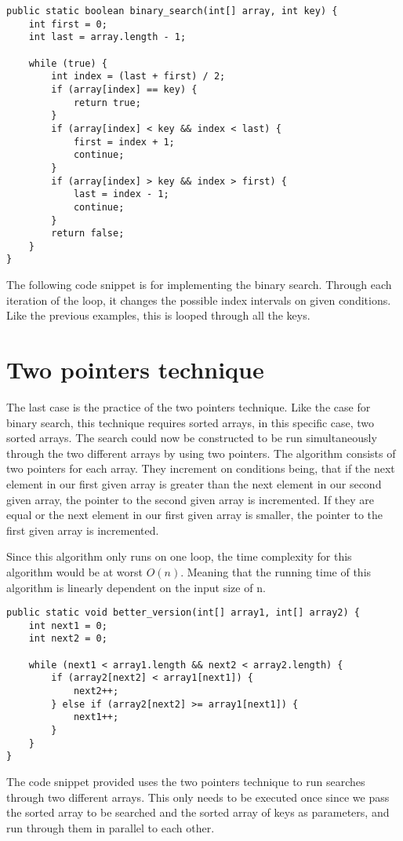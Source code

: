 \documentclass[a4paper,11pt]{article}
\begin{document}
\begin{verbatim}
public static boolean binary_search(int[] array, int key) {
    int first = 0;
    int last = array.length - 1;
    
    while (true) {
        int index = (last + first) / 2;
        if (array[index] == key) {
            return true;
        }
        if (array[index] < key && index < last) {
            first = index + 1;
            continue;
        }
        if (array[index] > key && index > first) {
            last = index - 1;
            continue;
        }
        return false;
    }
}
\end{verbatim}
    The following code snippet is for implementing the binary search. Through each iteration of the loop, it changes the possible index intervals on given conditions. Like the previous examples, this is looped through all the keys.
\section*{Two pointers technique}

    The last case is the practice of the two pointers technique. Like the case for binary search, this technique requires sorted arrays, in this specific case, two sorted arrays. The search could now be constructed to be run simultaneously through the two different arrays by using two pointers. The algorithm consists of two pointers for each array. They increment on conditions being, that if the next element in our first given array is greater than the next element in our second given array, the pointer to the second given array is incremented. If they are equal or the next element in our first given array is smaller, the pointer to the first given array is incremented. 

    Since this algorithm only runs on one loop, the time complexity for this algorithm would be at worst $O(n)$. Meaning that the running time of this algorithm is linearly dependent on the input size of n.
    
\begin{verbatim}
public static void better_version(int[] array1, int[] array2) {
    int next1 = 0;
    int next2 = 0;
    
    while (next1 < array1.length && next2 < array2.length) {
        if (array2[next2] < array1[next1]) {
            next2++;
        } else if (array2[next2] >= array1[next1]) {
            next1++;
        }
    }
}
\end{verbatim}
    The code snippet provided uses the two pointers technique to run searches through two different arrays. This only needs to be executed once since we pass the sorted array to be searched and the sorted array of keys as parameters, and run through them in parallel to each other.
\end{document}
